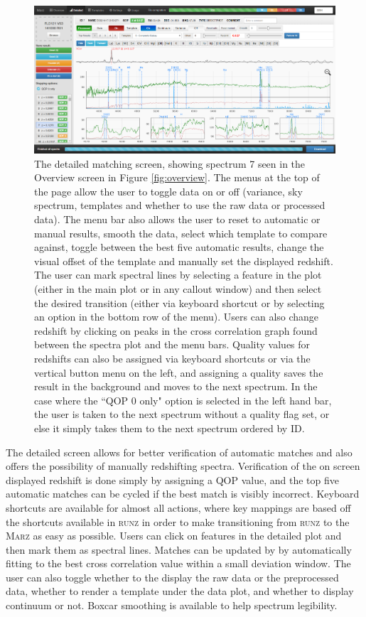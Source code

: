 \documentclass[iop]{emulateapj}
\newcommand{\runz}{\textsc{runz}}
\newcommand{\marz}{\textsc{Marz}}
\begin{document}
\begin{figure}[H]
\centering
\includegraphics[width=\textwidth]{InterfaceZ2.png}
\caption{The detailed matching screen, showing spectrum 7 seen in the Overview screen in Figure \ref{fig:overview}. The menus at the top of the page allow the user to toggle data on or off (variance, sky spectrum, templates and whether to use the raw data or processed data). The menu bar also allows the user to reset to automatic or manual results, smooth the data, select which template to compare against, toggle between the best five automatic results, change the visual offset of the template and manually set the displayed redshift. The user can mark spectral lines by selecting a feature in the plot (either in the main plot or in any callout window) and then select the desired transition (either via keyboard shortcut or by selecting an option in the bottom row of the menu). Users can also change redshift by clicking on peaks in the cross correlation graph found between the spectra plot and the menu bars. Quality values for redshifts can also be assigned via keyboard shortcuts or via the vertical button menu on the left, and assigning a quality saves the result in the background and moves to the next spectrum. In the case where the ``QOP 0 only" option is selected in the left hand bar, the user is taken to the next spectrum without a quality flag set, or else it simply takes them to the next spectrum ordered by ID.}
\label{fig:detailed}
\end{figure}

The detailed screen allows for better verification of automatic matches and also offers the possibility of manually redshifting spectra. Verification of the on screen displayed redshift is done simply by assigning a QOP value, and the top five automatic matches can be cycled if the best match is visibly incorrect. Keyboard shortcuts are available for almost all actions, where key mappings are based off the shortcuts available in \runz{} in order to make transitioning from \runz{} to the \marz{} as easy as possible. Users can click on features in the detailed plot and then mark them as spectral lines. Matches can be updated by by automatically fitting to the best cross correlation value within a small deviation window. The user can also toggle whether to the display the raw data or the preprocessed data, whether to render a template under the data plot, and whether to display continuum or not. Boxcar smoothing is available to help spectrum legibility.\\
\end{document}
